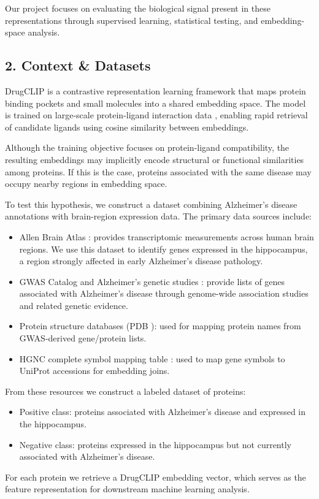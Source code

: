 \documentclass{article}
\begin{document}
Our project focuses on evaluating the biological signal present in these representations through supervised learning, statistical testing, and embedding-space analysis.

\subsection*{2. Context \& Datasets}
DrugCLIP is a contrastive representation learning framework that maps protein binding pockets \cite{method2018} and small molecules into a shared embedding space. The model is trained on large-scale protein-ligand interaction data \cite{drugbank2018,chembl2019}, enabling rapid retrieval of candidate ligands using cosine similarity between embeddings.

Although the training objective focuses on protein-ligand compatibility, the resulting embeddings may implicitly encode structural or functional similarities among proteins. If this is the case, proteins associated with the same disease may occupy nearby regions in embedding space.

To test this hypothesis, we construct a dataset combining Alzheimer's disease annotations \cite{seaad2024} with brain-region expression data. The primary data sources include:
\begin{itemize}
    \item Allen Brain Atlas \cite{allenAtlas2012}: provides transcriptomic measurements across human brain regions. We use this dataset to identify genes expressed in the hippocampus, a region strongly affected in early Alzheimer's disease pathology.
    \item GWAS Catalog \cite{disgenet2023} and Alzheimer's genetic studies \cite{lambert2013}: provide lists of genes associated with Alzheimer's disease through genome-wide association studies and related genetic evidence.
    \item Protein structure databases (PDB \cite{pdb2000}): used for mapping protein names from GWAS-derived gene/protein lists.
    \item HGNC complete symbol mapping table \cite{hgncCompleteSet}: used to map gene symbols to UniProt accessions for embedding joins.
\end{itemize}

From these resources we construct a labeled dataset of proteins:
\begin{itemize}
    \item Positive class: proteins associated with Alzheimer's disease and expressed in the hippocampus.
    \item Negative class: proteins expressed in the hippocampus but not currently associated with Alzheimer's disease.
\end{itemize}
For each protein we retrieve a DrugCLIP embedding vector, which serves as the feature representation for downstream machine learning analysis.
\end{document}
